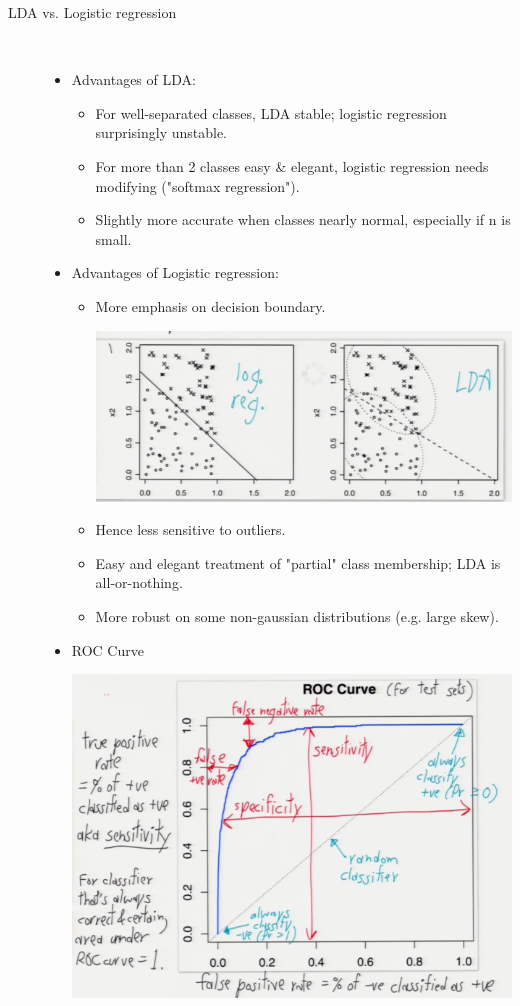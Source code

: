\documentclass[10pt]{article}
\begin{document}
\begin{description}
			\item[LDA vs. Logistic regression]
			\
				\begin{itemize}
					\item Advantages of LDA:
						\begin{itemize}
							\item For well-separated classes, LDA stable; logistic regression surprisingly unstable.
							\item For more than 2 classes easy \& elegant, logistic regression needs modifying ("softmax regression").
							\item Slightly more accurate when classes nearly normal, especially if n is small.
						\end{itemize}
					\item Advantages of Logistic regression:
						\begin{itemize}
							\item More emphasis on decision boundary.
							\begin{center}
								\includegraphics[scale=0.5]{images/ldavsregression}
							\end{center}
							\item Hence less sensitive to outliers.
							\item Easy and elegant treatment of "partial" class membership; LDA is all-or-nothing.
							\item More robust on some non-gaussian distributions (e.g. large skew).
						\end{itemize}
					\item ROC Curve
						\begin{center}
							\includegraphics[scale=0.5]{images/ROCCurve}

\end{center}
\end{itemize}
\end{description}
\end{document}
